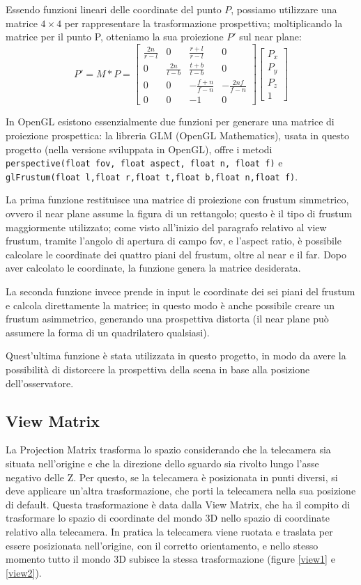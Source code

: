 Essendo funzioni lineari delle coordinate del punto $P$, possiamo utilizzare una matrice $4\times 4$ per rappresentare la trasformazione prospettiva; moltiplicando la matrice per il punto P, otteniamo la sua proiezione $P'$ sul near plane:
$$P'=M*P=
\begin{bmatrix}
\frac{2n}{r-l} & 0 & \frac{r+l}{r-l} & 0 \\
0 & \frac{2n}{t-b} & \frac{t+b}{t-b} & 0 \\
0 & 0 & -\frac{f+n}{f-n} & -\frac{2nf}{f-n} \\
0 & 0 & -1 & 0
\end{bmatrix}
\begin{bmatrix}
P_x \\ P_y \\ P_z \\ 1
\end{bmatrix}$$

In OpenGL esistono essenzialmente due funzioni per generare una matrice di proiezione prospettica: la libreria GLM (OpenGL Mathematics), usata in questo progetto (nella versione sviluppata in OpenGL), offre i metodi \texttt{perspective(float fov, float aspect, float n, float f)}
e \texttt{glFrustum(float l,float r,float t,float b,float n,float f)}.

La prima funzione restituisce una matrice di proiezione con frustum simmetrico, ovvero il near plane assume la figura di un rettangolo; questo è il tipo di frustum maggiormente utilizzato; come visto all'inizio del paragrafo relativo al view frustum, tramite l'angolo di apertura di campo fov, e l'aspect ratio, è possibile calcolare le coordinate dei quattro piani del frustum, oltre al near e il far. Dopo aver calcolato le coordinate, la funzione genera la matrice desiderata.

La seconda funzione invece prende in input le coordinate dei sei piani del frustum e calcola direttamente la matrice; in questo modo è anche possibile creare un frustum asimmetrico, generando una prospettiva distorta (il near plane può assumere la forma di un quadrilatero qualsiasi).

Quest'ultima funzione è stata utilizzata in questo progetto, in modo da avere la possibilità di distorcere la prospettiva della scena in base alla posizione dell'osservatore.  

\subsection{View Matrix}
La Projection Matrix trasforma lo spazio considerando che la telecamera sia situata nell'origine e che la direzione dello sguardo sia rivolto lungo l'asse negativo delle Z. Per questo, se la telecamera è posizionata in punti diversi, si deve applicare un'altra trasformazione, che porti la telecamera nella sua posizione di default. Questa trasformazione è data dalla View Matrix, che ha il compito di trasformare lo spazio di coordinate del mondo 3D nello spazio di coordinate relativo alla telecamera. In pratica la telecamera viene ruotata e traslata per essere posizionata nell'origine, con il corretto orientamento, e nello stesso momento tutto il mondo 3D subisce la stessa trasformazione (figure \ref{view1} e \ref{view2}).

